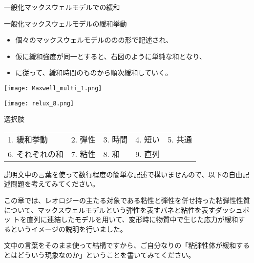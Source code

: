 \documentclass[uplatex,dvipdfmx,a4paper,11pt]{jsarticle}
\begin{document}
\begin{qlist}
\begin{qlist2}
			\vspace{5mm}
			\qitem 一般化マックスウェルモデルでの緩和
			\begin{center}
				\begin{minipage}{0.86\textwidth}
					\begin{itembox}[l]{一般化マックスウェルモデルの緩和挙動}
						\begin{itemize}
							\item 個々のマックスウェルモデルの\qbox{}の\qbox{}の形で記述され、
							\item 仮に緩和強度が同一とすると、右図のように単純な和となり、
							\item \qbox{}に従って、緩和時間の\qbox{}ものから順次緩和していく。
						\end{itemize}
					\end{itembox}
				\end{minipage}
				\begin{minipage}{0.43\textwidth}
					\begin{center}
						\texttt{[image: Maxwell\_multi\_1.png]}
					\end{center}
				\end{minipage}
				\begin{minipage}{0.43\textwidth}
					\begin{center}
						\texttt{[image: relux\_8.png]}
					\end{center}
				\end{minipage}
			\end{center}
				
		\end{qlist2}

		\begin{itembox}[l]{選択肢}
			\begin{center}
				\begin{tabular}{lllll}
					1. 緩和挙動	&2. 弾性	&3. 時間	&4. 短い	&5. 共通\\
					6. それぞれの和	&7. 粘性		&8. 和	&9. 直列
				\end{tabular}
			\end{center}
		\end{itembox}
\end{qlist}


説明文中の言葉を使って数行程度の簡単な記述で構いませんので、以下の自由記述問題を考えてみてください。
\begin{qlist}
\qitem この章では、レオロジーの主たる対象である粘性と弾性を併せ持った粘弾性性質について、マックスウェルモデルという弾性を表すバネと粘性を表すダッシュポッ
トを直列に連結したモデルを用いて、変形時に物質中で生じた応力が緩和するというイメージの説明を行いました。

文中の言葉をそのまま使って結構ですから、ご自分なりの「粘弾性体が緩和するとはどういう現象なのか」ということを書いてみてください。
\end{qlist}


\clearpage
\end{document}
